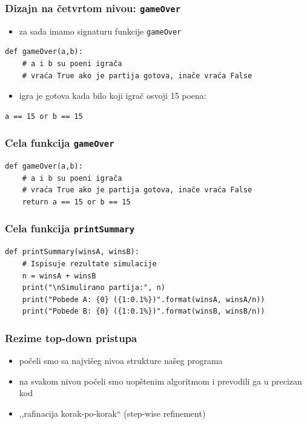 \documentclass[utf8,compress,aspectratio=169]{beamer}
\begin{document}
\begin{frame}[fragile]
  \frametitle{Dizajn na četvrtom nivou: \texttt{gameOver}}
\begin{itemize}
  \item za sada imamo signaturu funkcije \texttt{gameOver}
\end{itemize}
\begin{verbatim}
def gameOver(a,b):
    # a i b su poeni igrača
    # vraća True ako je partija gotova, inače vraća False
\end{verbatim}
\begin{itemize}
  \item igra je gotova kada bilo koji igrač osvoji 15 poena:
\end{itemize}
\begin{verbatim}
a == 15 or b == 15
\end{verbatim}
\end{frame}

\begin{frame}[fragile]
  \frametitle{Cela funkcija \texttt{gameOver}}
\begin{verbatim}
def gameOver(a,b):
    # a i b su poeni igrača
    # vraća True ako je partija gotova, inače vraća False
    return a == 15 or b == 15
\end{verbatim}
\end{frame}

\begin{frame}[fragile,shrink=10]
  \frametitle{Cela funkcija \texttt{printSummary}}
\begin{verbatim}
def printSummary(winsA, winsB):
    # Ispisuje rezultate simulacije
    n = winsA + winsB
    print("\nSimulirano partija:", n)
    print("Pobede A: {0} ({1:0.1%})".format(winsA, winsA/n))
    print("Pobede B: {0} ({1:0.1%})".format(winsB, winsB/n))
\end{verbatim}
\end{frame}

\begin{frame}
  \frametitle{Rezime top-down pristupa}
\begin{itemize}
  \item počeli smo sa najvišeg nivoa strukture našeg programa
  \item na svakom nivou počeli smo uopštenim algoritmom i prevodili ga u precizan kod
  \item ,,rafinacija korak-po-korak`` (step-wise refinement)
\end{itemize}
\end{frame}
\end{document}
